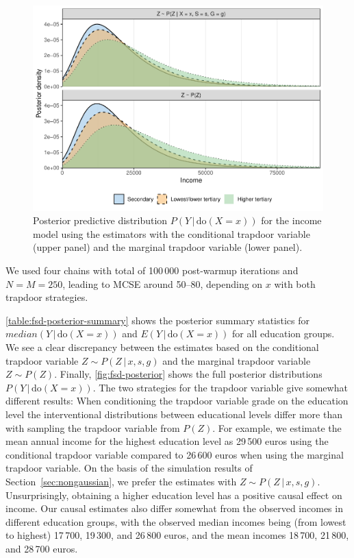 \documentclass[11pt,a4paper,twoside]{article}
\newcommand{\+}[1]{\ensuremath{\mathbf{#1}}}
\newcommand{\doo}{\textrm{do}}
\newcommand{\given}{{ \, | \, }}
\newcommand{\z}{trapdoor variable}
\begin{document}
	\begin{figure}[!ht]
		\includegraphics[width=\textwidth]{figures/fsd_posterior.pdf} 
		\caption{Posterior predictive distribution $P(Y \given \doo(X = x))$ for the income model using the estimators with the conditional \z{} (upper panel) and the marginal \z{} (lower panel).}
		\label{fig:fsd-posterior}
	\end{figure}
	We used four chains with total of 100\,000 post-warmup iterations and $N=M=250$, leading to MCSE around 50--80, depending on $x$ with both trapdoor strategies.
	
	\autoref{table:fsd-posterior-summary} shows the posterior summary statistics for $median(Y \given \doo(X = x))$ and $E(Y \given \doo(X = x))$ for all education groups. We see a clear discrepancy between the estimates based on the conditional \z{} $Z \sim P(Z \given  x, s, g)$ and the marginal \z{} $Z \sim P(Z)$. Finally, \autoref{fig:fsd-posterior} shows the full posterior distributions $P(Y \given \doo(X = x))$. The two strategies for the trapdoor variable give somewhat different results: When conditioning the trapdoor variable grade on the education level the interventional distributions between educational levels differ more than with sampling the trapdoor variable from $P(Z)$. For example, we estimate the mean annual income for the highest education level as 29\,500 euros using the conditional \z{} compared to 26\,600 euros when using the marginal \z{}. On the basis of the simulation results of Section~\ref{sec:nongaussian}, we prefer the estimates with $Z \sim P(Z \given x, s, g)$. Unsurprisingly, obtaining a higher education level has a positive causal effect on income. Our causal estimates also differ somewhat from the observed incomes in different education groups, with the observed median incomes being (from lowest to highest) 17\,700, 19\,300, and 26\,800 euros, and the mean incomes 18\,700, 21\,800, and 28\,700 euros.
		
\end{document}
